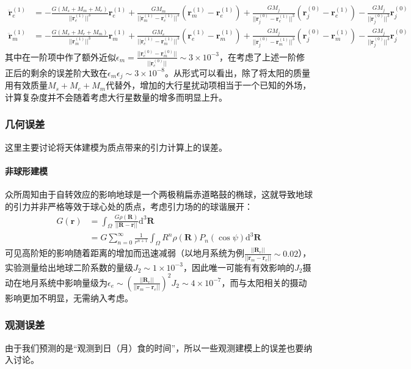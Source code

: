 \documentclass[hidelinks]{article}
\begin{document}
\begin{align*}
    \ddot{\mathbf{r}}_e^{(1)}&=-\frac{G(M_s+M_m+M_e)}{||\mathbf{r}_e^{(1)}||^3}\mathbf{r}_e^{(1)}+\frac{GM_m}{||\mathbf{r}_m^{(1)}-\mathbf{r}_e^{(1)}||^3}(\mathbf{r}_m^{(1)}-\mathbf{r}_e^{(1)})+\frac{GM_j}{||\mathbf{r}_j^{(0)}-\mathbf{r}_e^{(1)}||^3}(\mathbf{r}_j^{(0)}-\mathbf{r}_e^{(1)})-\frac{GM_j}{||\mathbf{r}_j^{(0)}||^3}\mathbf{r}_j^{(0)}\\
    \ddot{\mathbf{r}}_m^{(1)}&=-\frac{G(M_s+M_e+M_m)}{||\mathbf{r}_m^{(1)}||^3}\mathbf{r}_m^{(1)}+\frac{GM_e}{||\mathbf{r}_e^{(1)}-\mathbf{r}_m^{(1)}||^3}(\mathbf{r}_e^{(1)}-\mathbf{r}_m^{(1)})+\frac{GM_j}{||\mathbf{r}_j^{(0)}-\mathbf{r}_m^{(1)}||^3}(\mathbf{r}_j^{(0)}-\mathbf{r}_m^{(1)})-\frac{GM_j}{||\mathbf{r}_j^{(0)}||^3}\mathbf{r}_j^{(0)}
\end{align*}
其中在一阶项中作了额外近似$\epsilon_m=\frac{||\mathbf{r}_e^{(0)}-\mathbf{r}_m^{(0)}||}{||\mathbf{r}_e^{(0)}||}\sim3\times10^{-3}$，在考虑了上述一阶修正后的剩余的误差阶大致在$\epsilon_m\epsilon_j\sim3\times10^{-8}$。从形式可以看出，除了将太阳的质量用有效质量$M_s+M_e+M_m$代替外，增加的大行星扰动项相当于一个已知的外场，计算复杂度并不会随着考虑大行星数量的增多而明显上升。
\subsubsection{几何误差}
这里主要讨论将天体建模为质点带来的引力计算上的误差。
\paragraph{非球形建模}众所周知由于自转效应的影响地球是一个两极稍扁赤道略鼓的椭球，这就导致地球的引力并非严格等效于球心处的质点，考虑引力场的的球谐展开：
\begin{align*}
    G(\mathbf{r})&=\int_{\Omega}\frac{G\rho(\mathbf{R})}{||\mathbf{R}-\mathbf{r}||}\mathrm{d}^3\mathbf{R}\\
    &=G\sum_{n=0}^\infty\frac{1}{r^{n+1}}\int_\Omega R^n\rho(\mathbf{R})P_n(\cos{\psi})\mathrm{d}^3\mathbf{R}
\end{align*}
可见高阶矩的影响随着距离的增加而迅速减弱（以地月系统为例$\frac{||\mathbf{R}_e||}{||\mathbf{r}_m-\mathbf{r}_e||}\sim0.02$），实验测量给出地球二阶系数的量级$J_2\sim1\times10^{-3}$，因此唯一可能有有效影响的$J_2$摄动在地月系统中影响量级为$\epsilon_e\sim(\frac{||\mathbf{R}_e||}{||\mathbf{r}_m-\mathbf{r}_e||})^2J_2\sim4\times10^{-7}$，而与太阳相关的摄动影响更加不明显，无需纳入考虑。
\subsubsection{观测误差}
由于我们预测的是“观测到日（月）食的时间”，所以一些观测建模上的误差也要纳入讨论。
\end{document}
